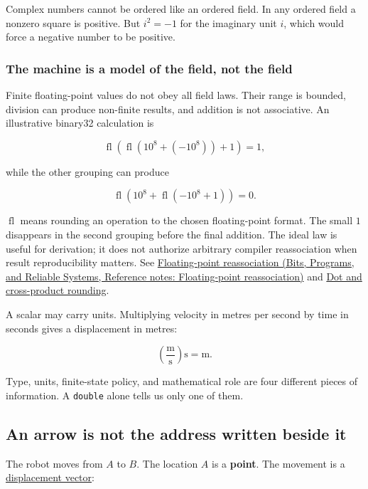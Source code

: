 Complex numbers cannot be ordered like an ordered field. In any ordered field a nonzero square is positive. But \(i^2=-1\) for the imaginary unit \(i\), which would force a negative number to be positive.

\subsubsection{The machine is a model of the field, not the field}\label{01-foundations-i-ch017-the-machine-is-a-model-of-the-field-not-the-field}

Finite floating-point values do not obey all field laws. Their range is bounded, division can produce non-finite results, and addition is not associative. An illustrative binary32 calculation is

\[
\operatorname{fl}\!\left(\operatorname{fl}(10^8+(-10^8))+1\right)=1,
\]

while the other grouping can produce

\[
\operatorname{fl}\!\left(10^8+\operatorname{fl}(-10^8+1)\right)=0.
\]

\(\operatorname{fl}\) means rounding an operation to the chosen floating-point format. The small \(1\) disappears in the second grouping before the final addition. The ideal law is useful for derivation; it does not authorize arbitrary compiler reassociation when result reproducibility matters. See \href{../01-Bits-Programs-and-Reliable-Systems/main.pdf\#nameddest=appendix-c2ac4a84c283}{Floating-point reassociation (Bits, Programs, and Reliable Systems, Reference notes: Floating-point reassociation)} and \hyperref[appendix-5aef4f13483a]{Dot and cross-product rounding}.

A scalar may carry units. Multiplying velocity in metres per second by time in seconds gives a displacement in metres:

\[
\left(\frac{\mathrm m}{\mathrm s}\right)\mathrm s=\mathrm m.
\]

Type, units, finite-state policy, and mathematical role are four different pieces of information. A \texttt{double} alone tells us only one of them.

\subsection{An arrow is not the address written beside it}\label{01-foundations-i-ch017-an-arrow-is-not-the-address-written-beside-it}

The robot moves from \(A\) to \(B\). The location \(A\) is a \textbf{point}. The movement is a \hyperref[01-foundations-i-ch017-an-arrow-is-not-the-address-written-beside-it]{displacement vector}:

